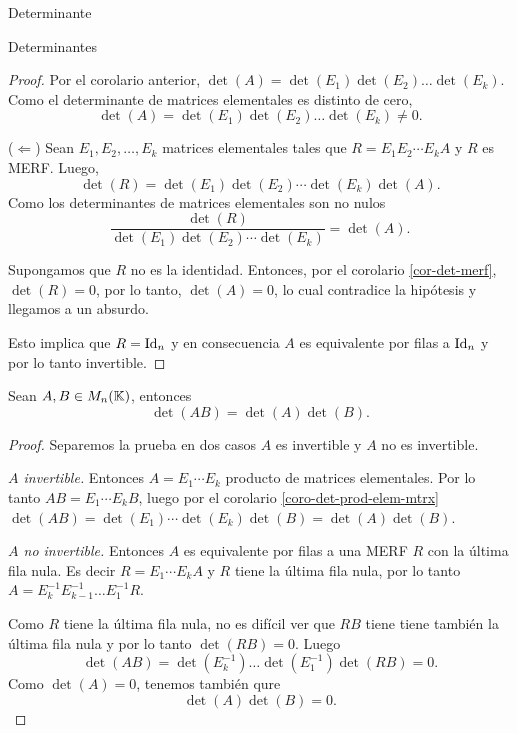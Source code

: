 \begin{chapter}{Determinante}
\begin{section}{Determinantes}
\begin{proof}
                Por el corolario anterior,  $\det(A) = \det(E_1) \det(E_2) \ldots \det(E_k)$. Como el determinante de matrices elementales es distinto de cero, $$\det(A) = \det(E_1) \det(E_2) \ldots \det(E_k)\ne 0.$$
        
                ($\Leftarrow$) Sean $E_1, E_2, \ldots, E_k$ matrices elementales tales que $R = E_1 E_2 \cdots E_k A$ y $R$ es MERF. Luego,
                \begin{equation*}
                    \det(R) = \det(E_1) \det(E_2) \cdots \det(E_k) \det(A). 
                \end{equation*}
                Como los determinantes de matrices  elementales son no nulos
        \begin{equation*}
            \frac{\det(R)}{\det(E_1) \det(E_2) \cdots \det(E_k) } = \det(A). \tag{*}
        \end{equation*}
    
        
        Supongamos que $R$ no es la identidad.  Entonces, por el corolario \ref{cor-det-merf}, $\det(R) =0$,  por lo tanto, $\det(A)=0$, lo cual contradice la hipótesis y llegamos a un absurdo. 
    
        Esto implica que  $R= \operatorname{Id}_n$ y en consecuencia  $A$ es equivalente por filas a $\operatorname{Id}_n$ y por lo tanto  invertible.
            \end{proof}
             
        
             \begin{teorema}\label{th-dem-detAB}  Sean $A,B \in M_n(\mathbb K)$,  entonces
            $$\det (A B) = \det(A)\det(B).$$
             \end{teorema}
             \begin{proof} 	Separemos la prueba en dos casos  $A$ es invertible  y  $A$ no es invertible.
    
                \textit{$A$ invertible.} Entonces $A= E_1\cdots E_k$ producto de matrices elementales. Por lo tanto  $AB =  E_1\cdots E_kB$, luego por el corolario \ref{coro-det-prod-elem-mtrx}  $\det(AB) =  \det(E_1)\cdots \det(E_k)\det(B) = \det(A)\det(B)$. 
                
                \textit{$A$ no invertible.}  Entonces $A$  es equivalente por filas a una MERF $R$ con la última fila nula. Es decir $R =E_1\cdots E_kA$ y $R$ tiene la última fila nula, por  lo tanto $A=  E_k^{-1}E_{k-1}^{-1}\ldots E_1^{-1}R$. 
                
                Como $R$ tiene la última fila nula, no es difícil ver que  $RB$ tiene tiene también la última fila nula y por lo tanto $\det(RB)=0$. Luego 
                 $$
                 \det(AB) = \det( E_k^{-1}) \ldots \det(E_1^{-1})\det(RB) =0.
                 $$
                 Como  $\det(A)=0$, tenemos también qure 
                 $$
                 \det(A)\det(B) =0.
                 $$  
             \end{proof}
             

\end{section}
\end{chapter}
